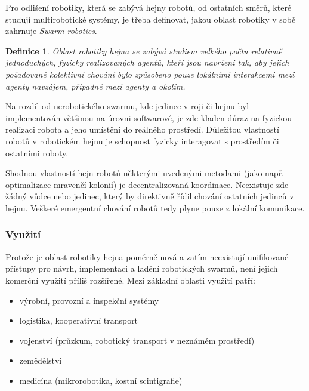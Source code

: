 \documentclass[a4paper,12pt]{article}
\newtheorem{define}{Definice}
\begin{document}
Pro odlišení robotiky, která se zabývá hejny robotů, od ostatních směrů, které
studují multirobotické systémy, je třeba definovat, jakou oblast robotiky v sobě
zahrnuje {\it Swarm robotics}.

\begin{define} Oblast robotiky hejna se zabývá studiem
velkého počtu relativně jednoduchých, fyzicky realizovaných agentů, kteří jsou
navrženi tak, aby jejich požadované kolektivní chování bylo způsobeno pouze
lokálními interakcemi mezi agenty navzájem, případně mezi agenty a okolím.
\cite{Sahin05}
\end{define}

Na rozdíl od nerobotického swarmu, kde jedinec v roji či hejnu byl implementován
většinou na úrovni softwarové, je zde kladen důraz na fyzickou realizaci robota
a jeho umístění do reálného prostředí. Důležitou vlastností robotů v robotickém
hejnu je schopnost fyzicky interagovat s prostředím či ostatními roboty.

Shodnou vlastností hejn robotů některými uvedenými metodami (jako např. optimalizace
mravenčí kolonií) je decentralizovaná koordinace. Neexistuje zde žádný vůdce
nebo jedinec, který by direktivně řídil chování ostatních jedinců v hejnu.
Veškeré emergentní chování robotů tedy plyne pouze z lokální komunikace.

\subsubsection{Využití}
Protože je oblast robotiky hejna poměrně nová a zatím neexistují unifikované přístupy
pro návrh, implementaci a ladění robotických swarmů, není jejich komerční využití
příliš rozšířené. Mezi základní oblasti využití patří:
\begin{itemize}
  \item výrobní, provozní a inspekční systémy
  \item logistika, kooperativní transport
  \item vojenství (průzkum, robotický transport v neznámém prostředí)
  \item zemědělství
  \item medicína (mikrorobotika, kostní scintigrafie\cite{Rifaie11})
\end{itemize}
\end{document}
